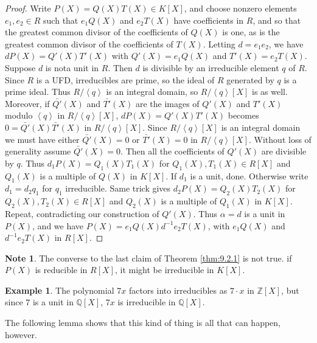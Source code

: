 \documentclass{article}
\newcommand{\Z}{\mathbb{Z}}
\newcommand{\Q}{\mathbb{Q}}
\newcommand{\rb}[1]{\left( #1 \right)}
\renewcommand{\sb}[1]{\left[ #1 \right]}
\newcommand{\ab}[1]{\left\langle #1 \right\rangle}
\theoremstyle{definition}\newtheorem{definition}{Definition}[subsection]
\theoremstyle{definition}\newtheorem{remark}[definition]{Remark}
\theoremstyle{definition}\newtheorem*{example}{Example}
\theoremstyle{definition}\newtheorem*{note}{Note}
\begin{document}
\begin{proof}
Write $ P\rb{X} = Q\rb{X}T\rb{X} \in K\sb{X} $, and choose nonzero elements $ e_1, e_2 \in R $ such that $ e_1Q\rb{X} $ and $ e_2T\rb{X} $ have coefficients in $ R $, and so that the greatest common divisor of the coefficients of $ Q\rb{X} $ is one, as is the greatest common divisor of the coefficients of $ T\rb{X} $. Letting $ d = e_1e_2 $, we have $ dP\rb{X} = Q'\rb{X}T'\rb{X} $ with $ Q'\rb{X} = e_1Q\rb{X} $ and $ T'\rb{X} = e_2T\rb{X} $. Suppose $ d $ is nota  unit in $ R $. Then $ d $ is divisible by an irreducible element $ q $ of $ R $. Since $ R $ is a UFD, irreducibles are prime, so the ideal of $ R $ generated by $ q $ is a prime ideal. Thus $ R / \ab{q} $ is an integral domain, so $ R / \ab{q}\sb{X} $ is as well. Moreover, if $ \bar{Q'}\rb{X} $ and $ \bar{T'}\rb{X} $ are the images of $ Q'\rb{X} $ and $ T'\rb{X} $ modulo $ \ab{q} $ in $ R / \ab{q}\sb{X} $, $ dP\rb{X} = Q'\rb{X}T'\rb{X} $ becomes $ 0 = \bar{Q'}\rb{X}\bar{T'}\rb{X} $ in $ R / \ab{q}\sb{X} $. Since $ R / \ab{q}\sb{X} $ is an integral domain we must have either $ \bar{Q'}\rb{X} = 0 $ or $ \bar{T'}\rb{X} = 0 $ in $ R / \ab{q}\sb{X} $. Without loss of generality assume $ \bar{Q'}\rb{X} = 0 $. Then all the coefficients of $ Q'\rb{X} $ are divisible by $ q $. Thus $ d_1P\rb{X} = Q_1\rb{X}T_1\rb{X} $ for $ Q_1\rb{X}, T_1\rb{X} \in R\sb{X} $ and $ Q_1\rb{X} $ is a multiple of $ Q\rb{X} $ in $ K\sb{X} $. If $ d_1 $ is a unit, done. Otherwise write $ d_1 = d_2q_1 $ for $ q_1 $ irreducible. Same trick gives $ d_2P\rb{X} = Q_2\rb{X}T_2\rb{X} $ for $ Q_2\rb{X}, T_2\rb{X} \in R\sb{X} $ and $ Q_2\rb{X} $ is a multiple of $ Q_1\rb{X} $ in $ K\sb{X} $. Repeat, contradicting our construction of $ Q'\rb{X} $. Thus $ \alpha = d $ is a unit in $ P\rb{X} $, and we have $ P\rb{X} = e_1Q\rb{X}d^{-1}e_2T\rb{X} $, with $ e_1Q\rb{X} $ and $ d^{-1}e_2T\rb{X} $ in $ R\sb{X} $.
\end{proof}

\begin{note}
The converse to the last claim of Theorem \ref{thm:9.2.1} is not true. if $ P\rb{X} $ is reducible in $ R\sb{X} $, it might be irreducible in $ K\sb{X} $.
\begin{example}
The polynomial $ 7x $ factors into irreducibles as $ 7 \cdot x $ in $ \Z\sb{X} $, but since $ 7 $ is a unit in $ \Q\sb{X} $, $ 7x $ is irreducible in $ \Q\sb{X} $.
\end{example}
The following lemma shows that this kind of thing is all that can happen, however.
\end{note}
\end{document}
